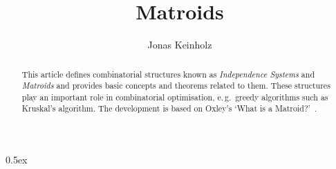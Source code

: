 \documentclass[11pt,a4paper]{article}
\begin{document}
\title{Matroids}
\author{Jonas Keinholz}
\maketitle

\begin{abstract}
This article defines combinatorial structures known as \emph{Independence Systems} and \emph{Matroids} and provides basic concepts and theorems related to them. These structures play an important role in combinatorial optimisation, e.\,g.\ greedy algorithms such as Kruskal's algorithm. The development is based on Oxley's `What is a Matroid?'~\cite{oxley}.
\end{abstract}

\newpage
\tableofcontents
\newpage
\parindent 0pt\parskip 0.5ex



\nocite{oxley}


\end{document}
